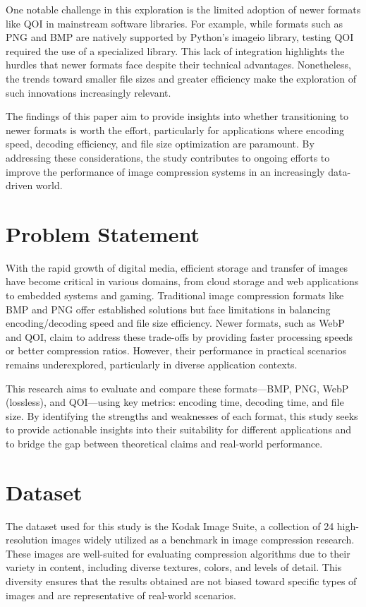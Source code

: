 \documentclass[conference]{IEEEtran}
\begin{document}
One notable challenge in this exploration is the limited adoption of newer formats like QOI in mainstream software libraries. For example, while formats such as PNG and BMP are natively supported by Python's imageio library, testing QOI required the use of a specialized library. This lack of integration highlights the hurdles that newer formats face despite their technical advantages. Nonetheless, the trends toward smaller file sizes and greater efficiency make the exploration of such innovations increasingly relevant.

The findings of this paper aim to provide insights into whether transitioning to newer formats is worth the effort, particularly for applications where encoding speed, decoding efficiency, and file size optimization are paramount. By addressing these considerations, the study contributes to ongoing efforts to improve the performance of image compression systems in an increasingly data-driven world.

\section{Problem Statement}

With the rapid growth of digital media, efficient storage and transfer of images have become critical in various domains, from cloud storage and web applications to embedded systems and gaming. Traditional image compression formats like BMP and PNG offer established solutions but face limitations in balancing encoding/decoding speed and file size efficiency. Newer formats, such as WebP and QOI, claim to address these trade-offs by providing faster processing speeds or better compression ratios. However, their performance in practical scenarios remains underexplored, particularly in diverse application contexts.

This research aims to evaluate and compare these formats—BMP, PNG, WebP (lossless), and QOI—using key metrics: encoding time, decoding time, and file size. By identifying the strengths and weaknesses of each format, this study seeks to provide actionable insights into their suitability for different applications and to bridge the gap between theoretical claims and real-world performance.


\section{Dataset}
The dataset used for this study is the Kodak Image Suite\cite{dataset_kodak}, a collection of 24 high-resolution images widely utilized as a benchmark in image compression research. These images are well-suited for evaluating compression algorithms due to their variety in content, including diverse textures, colors, and levels of detail. This diversity ensures that the results obtained are not biased toward specific types of images and are representative of real-world scenarios.
\end{document}
